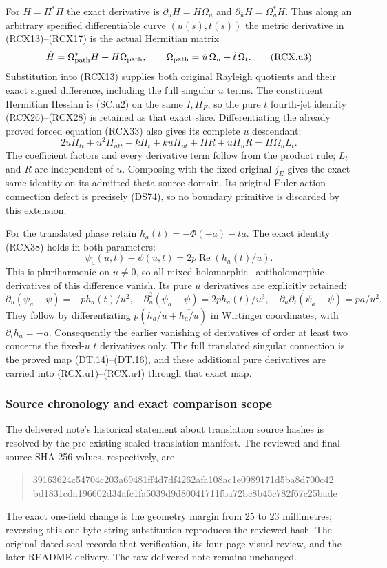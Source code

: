 For $H=\Pi^*\Pi$ the exact derivative is
$\partial_uH=H\Omega_u$ and
$\partial_{\bar u}H=\Omega_u^*H$.  Thus along an arbitrary
specified differentiable curve $(u(s),t(s))$ the metric
derivative in (RCX13)--(RCX17) is the actual Hermitian matrix
\[
 \dot H=\Omega_{\rm path}^*H+H\Omega_{\rm path},
 \qquad\Omega_{\rm path}=\dot u\,\Omega_u+\dot t\,\Omega_t.
 \tag{RCX.u3}
\]
Substitution into (RCX13) supplies both original Rayleigh
quotients and their exact signed difference, including the
full singular $u$ terms.  The constituent Hermitian Hessian
is (SC.u2) on the same $I,H_F$, so the pure $t$ fourth-jet
identity (RCX26)--(RCX28) is retained as that exact slice.
Differentiating the already proved forced equation (RCX33)
also gives its complete $u$ descendant:
\[
 2u\Pi_{tt}+u^2\Pi_{utt}+k\Pi_t+ku\Pi_{ut}
       +\Pi R+u\Pi_uR=\Pi\Omega_u L_t.             \tag{RCX.u4}
\]
The coefficient factors and every derivative term follow from
the product rule; $L_t$ and $R$ are independent of $u$.
Composing with the fixed original $j_E$ gives the exact same
identity on its admitted theta-source domain.  Its original
Euler-action connection defect is precisely (DS74), so no
boundary primitive is discarded by this extension.

For the translated phase retain $h_a(t)=-\Phi(-a)-ta$.
The exact identity (RCX38) holds in both parameters:
\[
 \psi_a(u,t)-\psi(u,t)=
             2p\operatorname{Re}(h_a(t)/u).          \tag{RCX.u5}
\]
This is pluriharmonic on $u\ne0$, so all mixed holomorphic--
antiholomorphic derivatives of this difference vanish.  Its
pure $u$ derivatives are explicitly retained:
\[
 \partial_u(\psi_a-\psi)=-p h_a(t)/u^2,\quad
 \partial_u^2(\psi_a-\psi)=2p h_a(t)/u^3,\quad
 \partial_u\partial_t(\psi_a-\psi)=p a/u^2.          \tag{RCX.u6}
\]
They follow by differentiating $p(h_a/u+\overline{h_a/u})$
in Wirtinger coordinates, with $\partial_t h_a=-a$.
Consequently the earlier vanishing of derivatives of order
at least two concerns the fixed-$u$ $t$ derivatives only.
The full translated singular connection is the proved map
(DT.14)--(DT.16), and these additional pure derivatives
are carried into (RCX.u1)--(RCX.u4) through that exact map.

\subsubsection{Source chronology and exact comparison scope}

The delivered note's historical statement about translation source
hashes is resolved by the pre-existing sealed translation manifest.
The reviewed and final source SHA-256 values, respectively, are
\begin{quote}\small\ttfamily
\noindent
39163624c54704c203a69481ff4d7df4262afa108ac1e0989171d5ba8d700c42\\
bd1831cda196602d34afc1fa5039d9d80041711fba72bc8b45c782f67c25bade
\end{quote}
The exact one-field change is the geometry margin from \(25\) to
\(23\) millimetres; reversing this one byte-string substitution
reproduces the reviewed hash. The original dated seal records
that verification, its four-page visual review, and the later
README delivery. The raw delivered note remains unchanged.


